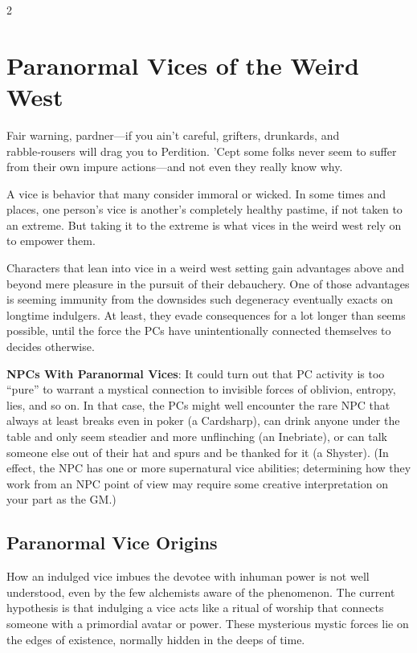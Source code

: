 \begin{multicols}{2}

\chapter{Paranormal Vices of the Weird West}

Fair warning, pardner—if you ain’t careful, grifters, drunkards, and rabble‑rousers will drag you to Perdition. ’Cept some folks never seem to suffer from their own impure actions—and not even they really know why. 

A vice is behavior that many consider immoral or wicked. In some times and places, one person’s vice is another’s completely healthy pastime, if not taken to an extreme. But taking it to the extreme is what vices in the weird west rely on to empower them. 

Characters that lean into vice in a weird west setting gain advantages above and beyond mere pleasure in the pursuit of their debauchery. One of those advantages is seeming immunity from the downsides such degeneracy eventually exacts on longtime indulgers. At least, they evade consequences for a lot longer than seems possible, until the force the PCs have unintentionally connected themselves to decides otherwise. 

\textbf{NPCs With Paranormal Vices}: It could turn out that PC activity is too “pure” to warrant a mystical connection to invisible forces of oblivion, entropy, lies, and so on. In that case, the PCs might well encounter the rare NPC that always at least breaks even in poker (a Cardsharp), can drink anyone under the table and only seem steadier and more unflinching (an Inebriate), or can talk someone else out of their hat and spurs and be thanked for it (a Shyster). (In effect, the NPC has one or more supernatural vice abilities; determining how they work from an NPC point of view may require some creative interpretation on your part as the GM.)

\section{Paranormal Vice Origins}

How an indulged vice imbues the devotee with inhuman power is not well understood, even by the few alchemists aware of the phenomenon. The current hypothesis is that indulging a vice acts like a ritual of worship that connects someone with a primordial avatar or power. These mysterious mystic forces lie on the edges of existence, normally hidden in the deeps of time.


\end{multicols}
